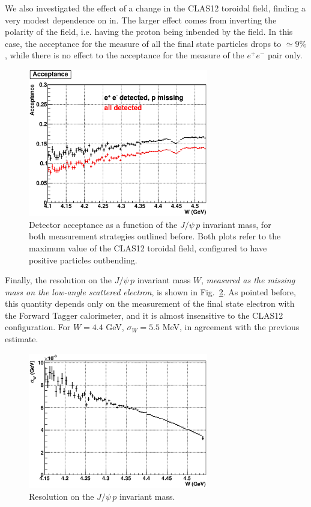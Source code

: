 \documentclass[a4paper,10pt]{article}
\begin{document}
We also investigated the effect of a change in the CLAS12 toroidal field, finding a very modest dependence on in. 
The larger effect comes from inverting the polarity of the field, i.e. having the proton being inbended by the field. In this case, the acceptance for the measure of all the final state particles drops to $\simeq 9\%$, while there is no effect to the acceptance for the measure of the $e^+ e^-$ pair only.

\begin{figure}[tpb]
\center
\includegraphics[width=0.7\textwidth]{acceptanceNominal.eps}
\caption{\footnotesize \label{fig:5} Detector acceptance as a function of the  $J/\psi\, p$ invariant mass, for both measurement strategies outlined before. Both plots refer to the maximum value of the CLAS12 toroidal field, configured to have positive particles outbending. }
\end{figure}

Finally, the resolution on the $J/\psi\, p$ invariant mass $W$, \textit{measured as the missing mass on the low-angle scattered electron}, is shown in Fig.~\ref{fig:6}. As pointed before, this quantity depends only on the measurement of the final state electron with the Forward Tagger calorimeter, and it is almost insensitive to the CLAS12 configuration. For $W=4.4$ GeV, $\sigma_W=5.5$ MeV, in agreement with the previous estimate.

\begin{figure}[tpb]
\center
\includegraphics[width=0.7\textwidth]{resolutionW.eps}
\caption{\footnotesize \label{fig:6} Resolution on the  $J/\psi\, p$ invariant mass.}
\end{figure}
\end{document}
